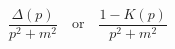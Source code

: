 \begin{equation}
\frac{\Delta (p)}{p^2 + m^2} \quad \text{or}\quad \frac{1 -
K(p)}{p^2+m^2}
\end{equation}

